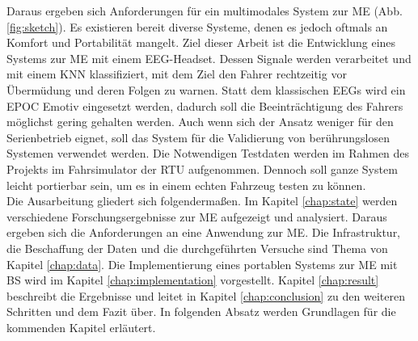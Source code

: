 Daraus ergeben sich Anforderungen für ein multimodales System zur \acl{ME}  (Abb. \ref{fig:sketch}). Es existieren bereit diverse Systeme, denen es jedoch oftmals an Komfort und Portabilität mangelt. Ziel dieser Arbeit ist die Entwicklung eines Systems zur \acl{ME} mit einem EEG-Headset. 
Dessen Signale werden verarbeitet und mit einem KNN klassifiziert, mit dem Ziel den Fahrer rechtzeitig vor Übermüdung und deren Folgen zu warnen.
Statt dem klassischen EEGs wird ein EPOC Emotiv eingesetzt werden, dadurch soll die Beeinträchtigung des Fahrers möglichst gering gehalten
werden. Auch wenn sich der Ansatz weniger für den Serienbetrieb eignet, soll das System für die Validierung von berührungslosen Systemen verwendet werden. Die Notwendigen Testdaten werden im Rahmen des Projekts im Fahrsimulator der \acl{RTU} aufgenommen. Dennoch soll ganze System leicht portierbar sein, um es in einem echten Fahrzeug testen zu können.
\\ 

Die Ausarbeitung gliedert sich folgendermaßen. Im Kapitel \ref{chap:state} werden verschiedene Forschungsergebnisse zur \acl{ME} aufgezeigt und analysiert. Daraus ergeben sich die Anforderungen an eine Anwendung zur \acl{ME}. Die Infrastruktur, die Beschaffung der Daten und die durchgeführten Versuche sind Thema von Kapitel \ref{chap:data}. Die Implementierung eines portablen Systems zur \acl{ME} mit \acl{BS} wird im Kapitel \ref{chap:implementation} vorgestellt. Kapitel \ref{chap:result} beschreibt die Ergebnisse und leitet in Kapitel \ref{chap:conclusion} zu den weiteren Schritten und dem Fazit über. In folgenden Absatz werden Grundlagen für die kommenden Kapitel erläutert.